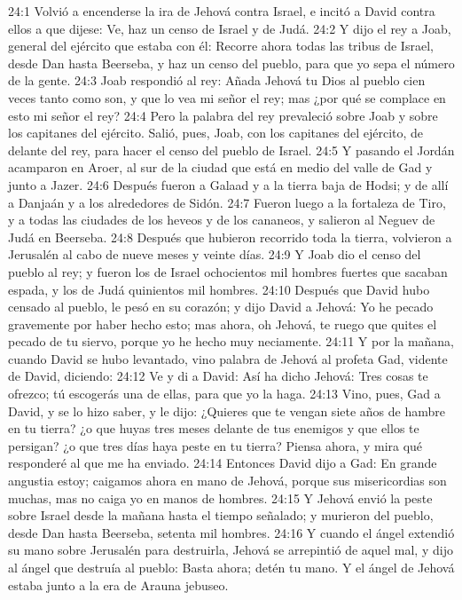 24:1 Volvió a encenderse la ira de Jehová contra Israel, e incitó a David contra ellos a que dijese: Ve, haz un censo de Israel y de Judá.  
24:2 Y dijo el rey a Joab, general del ejército que estaba con él: Recorre ahora todas las tribus de Israel, desde Dan hasta Beerseba, y haz un censo del pueblo, para que yo sepa el número de la gente.  
24:3 Joab respondió al rey: Añada Jehová tu Dios al pueblo cien veces tanto como son, y que lo vea mi señor el rey; mas ¿por qué se complace en esto mi señor el rey?  
24:4 Pero la palabra del rey prevaleció sobre Joab y sobre los capitanes del ejército. Salió, pues, Joab, con los capitanes del ejército, de delante del rey, para hacer el censo del pueblo de Israel.  
24:5 Y pasando el Jordán acamparon en Aroer, al sur de la ciudad que está en medio del valle de Gad y junto a Jazer.  
24:6 Después fueron a Galaad y a la tierra baja de Hodsi; y de allí a Danjaán y a los alrededores de Sidón.  
24:7 Fueron luego a la fortaleza de Tiro, y a todas las ciudades de los heveos y de los cananeos, y salieron al Neguev de Judá en Beerseba.  
24:8 Después que hubieron recorrido toda la tierra, volvieron a Jerusalén al cabo de nueve meses y veinte días.  
24:9 Y Joab dio el censo del pueblo al rey; y fueron los de Israel ochocientos mil hombres fuertes que sacaban espada, y los de Judá quinientos mil hombres.  
24:10 Después que David hubo censado al pueblo, le pesó en su corazón; y dijo David a Jehová: Yo he pecado gravemente por haber hecho esto; mas ahora, oh Jehová, te ruego que quites el pecado de tu siervo, porque yo he hecho muy neciamente.  
24:11 Y por la mañana, cuando David se hubo levantado, vino palabra de Jehová al profeta Gad, vidente de David, diciendo:  
24:12 Ve y di a David: Así ha dicho Jehová: Tres cosas te ofrezco; tú escogerás una de ellas, para que yo la haga.  
24:13 Vino, pues, Gad a David, y se lo hizo saber, y le dijo: ¿Quieres que te vengan siete años de hambre en tu tierra? ¿o que huyas tres meses delante de tus enemigos y que ellos te persigan? ¿o que tres días haya peste en tu tierra? Piensa ahora, y mira qué responderé al que me ha enviado.  
24:14 Entonces David dijo a Gad: En grande angustia estoy; caigamos ahora en mano de Jehová, porque sus misericordias son muchas, mas no caiga yo en manos de hombres.  
24:15 Y Jehová envió la peste sobre Israel desde la mañana hasta el tiempo señalado; y murieron del pueblo, desde Dan hasta Beerseba, setenta mil hombres.  
24:16 Y cuando el ángel extendió su mano sobre Jerusalén para destruirla, Jehová se arrepintió de aquel mal, y dijo al ángel que destruía al pueblo: Basta ahora; detén tu mano. Y el ángel de Jehová estaba junto a la era de Arauna jebuseo. 
